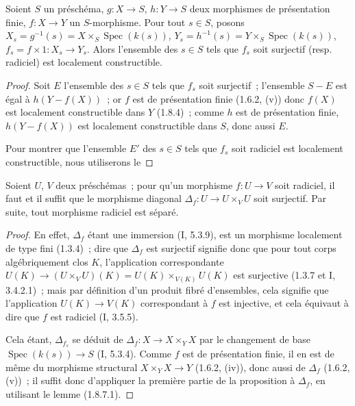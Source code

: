 
\begin{proposition}[1.8.7]
\label{IV.1.8.7-fr}
Soient $S$ un préschéma, $g:X\to S$, $h:Y\to S$ deux morphismes de
présentation finie, $f:X\to Y$ un $S$-morphisme. Pour tout $s\in S$, posons
$X_s=g^{-1}(s)=X\times_S\operatorname{Spec}(k(s))$,
$Y_s=h^{-1}(s)=Y\times_S\operatorname{Spec}(k(s))$,
$f_s=f\times 1:X_s\to Y_s$. Alors l'ensemble des $s\in S$ tels que $f_s$
soit surjectif (resp. radiciel) est localement constructible.
\end{proposition}

\begin{proof}
Soit $E$ l'ensemble des $s\in S$ tels que $f_s$ soit surjectif~; l'ensemble
$S-E$ est égal à $h(Y-f(X))$~; or $f$ est de présentation finie (1.6.2, (v))
donc $f(X)$ est localement constructible dans $Y$ (1.8.4)~; comme $h$ est de
présentation finie, $h(Y-f(X))$ est localement constructible dans $S$, donc
aussi $E$.

Pour montrer que l'ensemble $E'$ des $s\in S$ tels que $f_s$ soit radiciel
est localement constructible, nous utiliserons le
\end{proof}

\begin{lemma}[1.8.7.1]
Soient $U$, $V$ deux préschémas~; pour qu'un morphisme $f:U\to V$ soit
radiciel, il faut et il suffit que le morphisme diagonal
$\Delta_f:U\to U\times_VU$ soit surjectif. Par suite, tout morphisme radiciel
est séparé.
\end{lemma}

\begin{proof}
En effet, $\Delta_f$ étant une immersion (I, 5.3.9), est un morphisme
localement de type fini (1.3.4)~; dire que $\Delta_f$ est surjectif signifie
donc que pour tout corps algébriquement clos $K$, l'application
correspondante $U(K)\to(U\times_VU)(K)=U(K)\times_{V(K)}U(K)$ est surjective
(1.3.7 et I, 3.4.2.1)~; mais par définition d'un produit fibré d'ensembles,
cela signifie que l'application $U(K)\to V(K)$ correspondant à $f$ est
injective, et cela équivaut à dire que $f$ est radiciel (I, 3.5.5).

Cela étant, $\Delta_{f_s}$ se déduit de $\Delta_f:X\to X\times_YX$ par le
changement de base $\operatorname{Spec}(k(s))\to S$ (I, 5.3.4). Comme $f$
est de présentation finie, il en est de même du morphisme structural
$X\times_YX\to Y$ (1.6.2, (iv)), donc aussi de $\Delta_f$ (1.6.2, (v))~; il
suffit donc d'appliquer la première partie de la proposition à $\Delta_f$,
en utilisant le lemme (1.8.7.1).
\end{proof}

